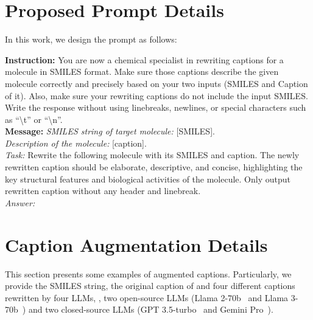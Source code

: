 \section{Proposed Prompt Details}
\label{sec:appendix_prompt_details}

In this work, we design the prompt as follows:
\begin{mybox}
    \textbf{Instruction: }
    You are now a chemical specialist in rewriting captions for a molecule in SMILES format. Make sure those captions describe the given molecule correctly and precisely based on your two inputs (SMILES and Caption of it). 
    Also, make sure your rewriting captions do not include the input SMILES.
    Write the response without using linebreaks, newlines, or special characters such as ``\textbackslash t'' or ``\textbackslash n''.
    \\
    \textbf{Message: }
    \emph{SMILES string of target molecule:} [SMILES]. \\
    \emph{Description of the molecule:} [caption]. \\
    \emph{Task:} Rewrite the following molecule with its SMILES and caption. 
    The newly rewritten caption should be elaborate, descriptive, and concise, highlighting the key structural features and biological activities of the molecule. Only output rewritten caption without any header and linebreak. \\
    \emph{Answer:}
\end{mybox}

\section{Caption Augmentation Details} 
\label{sec:appendix_caption_details}



This section presents some examples of augmented captions. 
Particularly, we provide the SMILES string, the original caption of \olddataset and four different captions rewritten by four LLMs, \ie, two open-source LLMs (Llama 2-70b~\cite{TMSA23} and Llama 3-70b~\cite{TMSA23}) and two closed-source LLMs (GPT 3.5-turbo~\cite{AAAA23} and Gemini Pro~\cite{Gemini24}). 

